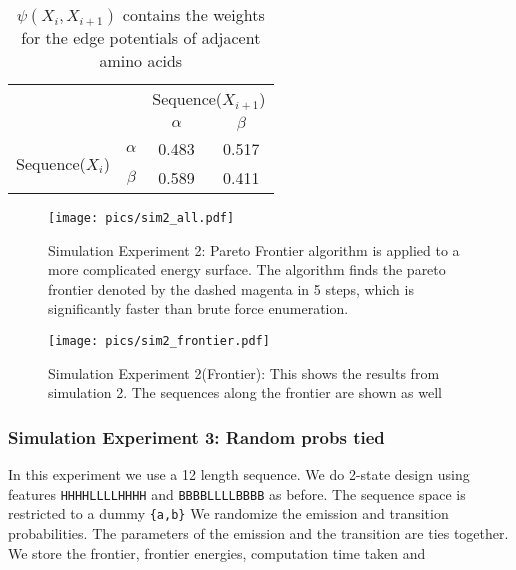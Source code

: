 \documentclass{article}
\begin{document}
\begin{table}
\begin{center}
\begin{tabular}{cc|c|c|}
\cline{3-4}
& & \multicolumn{2}{c|}{Sequence($X_{i+1}$)} \\ \cline{3-4}
& & $\alpha$ & $\beta$  \\ \cline{1-4}
\multicolumn{1}{|c|}{\multirow{2}{*}{Sequence($X_i$)}} &
\multicolumn{1}{|c|}{$\alpha$} & 0.483 & 0.517      \\ \cline{2-4}
\multicolumn{1}{|c|}{}                        &
\multicolumn{1}{|c|}{$\beta$} & 0.589 & 0.411      \\ \cline{1-4}
\end{tabular}
\end{center}
\caption{$\psi(X_i,X_{i+1})$ contains the weights for the edge potentials of adjacent amino acids}
\label{tab:psi4}
\end{table}


\begin{figure}[h!]
    \centering
    \texttt{[image: pics/sim2\_all.pdf]}
    \caption{Simulation Experiment 2: Pareto Frontier algorithm is applied to a more complicated energy surface. The algorithm finds the pareto frontier denoted by the dashed magenta in 5 steps, which is significantly faster than brute force enumeration.  }
    \label{fig:sim2_all}
\end{figure}

\begin{figure}[h!]
    \centering
    \texttt{[image: pics/sim2\_frontier.pdf]}
    \caption{Simulation Experiment 2(Frontier): This shows the results from simulation 2. The sequences along the frontier are shown as well }
    \label{fig:sim2_frontier}
\end{figure}

\pagebreak
\clearpage

\subsubsection{Simulation Experiment 3: Random probs tied}
\label{sim:randprobstied}
In this experiment we use a 12 length sequence. We do 2-state design using features \texttt{HHHHLLLLHHHH} and \texttt{BBBBLLLLBBBB} as before. The sequence space is restricted to a dummy \texttt{\{a,b\}}  We randomize the emission and transition probabilities. The parameters of the emission and the transition are ties together.  We store the frontier, frontier energies, computation time taken and 
\end{document}
